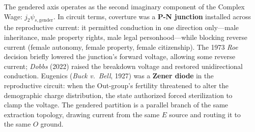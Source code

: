 \begin{keyinsight}
The gendered axis operates as the second imaginary component of the Complex Wage: $j_2 \psi_{s,\text{gender}}$. In circuit terms, coverture was a \textbf{P-N junction} installed across the reproductive current: it permitted conduction in one direction only---male inheritance, male property rights, male legal personhood---while blocking reverse current (female autonomy, female property, female citizenship). The 1973 \textit{Roe} decision briefly lowered the junction's forward voltage, allowing some reverse current; \textit{Dobbs} (2022) raised the breakdown voltage and restored unidirectional conduction. Eugenics (\textit{Buck v.\ Bell}, 1927) was a \textbf{Zener diode} in the reproductive circuit: when the Out-group's fertility threatened to alter the demographic charge distribution, the state authorized forced sterilization to clamp the voltage. The gendered partition is a parallel branch of the same extraction topology, drawing current from the same $E$ source and routing it to the same $O$ ground.
\end{keyinsight}
